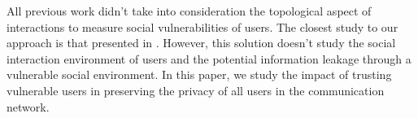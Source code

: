 





All previous work didn't take into consideration the topological aspect of interactions to measure social vulnerabilities of users.
The closest study to our approach is that presented in \cite{zeng_trustaware_2014}.
However,
	this solution doesn't study the social interaction environment of users and the potential information leakage through a vulnerable social environment.
In this paper,
	we study the impact of trusting vulnerable users in preserving the privacy of all users in the communication network.


